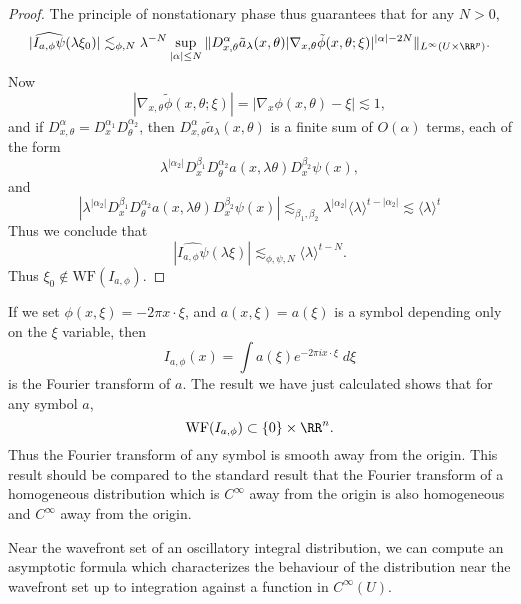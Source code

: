 \begin{proof}
    The principle of nonstationary phase thus guarantees that for any $N > 0$,
    \[ |\widehat{I_{a,\phi} \psi}(\lambda \xi_0)| \lesssim_{\phi,N} \lambda^{-N} \sup_{|\alpha| \leq N} \| D^\alpha_{x,\theta} \tilde{a}_\lambda(x,\theta) |\nabla_{x,\theta} \tilde{\phi}(x,\theta;\xi)|^{|\alpha| - 2N} \|_{L^\infty(U \times \RR^p)}. \]
    Now
    \[ |\nabla_{x,\theta} \tilde{\phi}(x,\theta;\xi)| = |\nabla_x \phi(x,\theta) - \xi| \lesssim 1, \]
    and if $D^\alpha_{x,\theta} = D^{\alpha_1}_x D^{\alpha_2}_\theta$, then $D^\alpha_{x,\theta} \tilde{a}_\lambda(x,\theta)$ is a finite sum of $O(\alpha)$ terms, each of the form
    \[ \lambda^{|\alpha_2|} D^{\beta_1}_x D^{\alpha_2}_\theta a(x,\lambda \theta) D^{\beta_2}_x \psi(x), \]
    and
    \[ |\lambda^{|\alpha_2|} D^{\beta_1}_x D^{\alpha_2}_\theta a(x,\lambda \theta) D^{\beta_2}_x \psi(x)| \lesssim_{\beta_1,\beta_2} \lambda^{|\alpha_2|} \langle \lambda \rangle^{t - |\alpha_2|} \lesssim \langle \lambda \rangle^t \]
    Thus we conclude that
    \[ |\widehat{I_{a,\phi} \psi}(\lambda \xi)| \lesssim_{\phi,\psi,N} \langle \lambda \rangle^{t - N}. \]
    Thus $\xi_0 \not \in \text{WF}(I_{a,\phi})$.
\end{proof}

\begin{example}
    If we set $\phi(x,\xi) = - 2 \pi x \cdot \xi$, and $a(x,\xi) = a(\xi)$ is a symbol depending only on the $\xi$ variable, then
    \[ I_{a,\phi}(x) = \int a(\xi) e^{- 2 \pi i x \cdot \xi}\; d\xi \]
    is the Fourier transform of $a$. The result we have just calculated shows that for any symbol $a$,
    \[ \text{WF}(I_{a,\phi}) \subset \{ 0 \} \times \RR^n. \]
    Thus the Fourier transform of any symbol is smooth away from the origin. This result should be compared to the standard result that the Fourier transform of a homogeneous distribution which is $C^\infty$ away from the origin is also homogeneous and $C^\infty$ away from the origin.
\end{example}

Near the wavefront set of an oscillatory integral distribution, we can compute an asymptotic formula which characterizes the behaviour of the distribution near the wavefront set up to integration against a function in $C^\infty(U)$.

